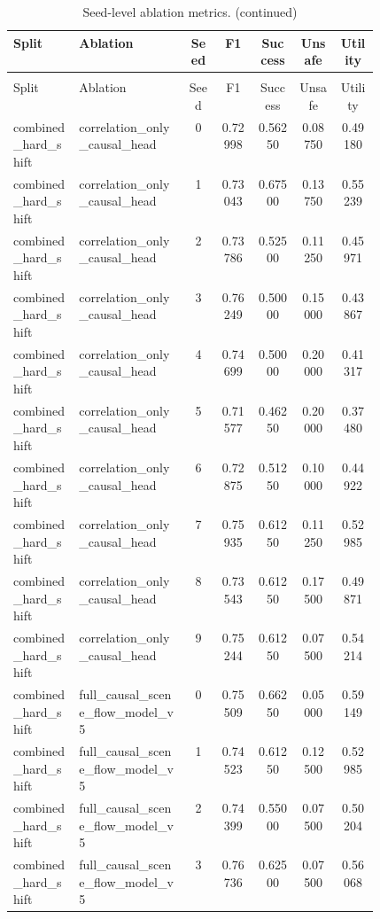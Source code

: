\documentclass{article}
\begin{document}
\begin{center}
\scriptsize
\begin{longtable}{p{0.18\linewidth}p{0.30\linewidth}ccccc}
\caption{Seed-level ablation metrics.}\label{tab:ablation-seeds}\\
\toprule
Split & Ablation & Seed & F1 & Success & Unsafe & Utility\\
\midrule
\endfirsthead
\caption[]{Seed-level ablation metrics. (continued)}\\
\toprule
Split & Ablation & Seed & F1 & Success & Unsafe & Utility\\
\midrule
\endhead
combined\_hard\_shift & correlation\_only\_causal\_head & 0 & 0.72998 & 0.56250 & 0.08750 & 0.49180\\
combined\_hard\_shift & correlation\_only\_causal\_head & 1 & 0.73043 & 0.67500 & 0.13750 & 0.55239\\
combined\_hard\_shift & correlation\_only\_causal\_head & 2 & 0.73786 & 0.52500 & 0.11250 & 0.45971\\
combined\_hard\_shift & correlation\_only\_causal\_head & 3 & 0.76249 & 0.50000 & 0.15000 & 0.43867\\
combined\_hard\_shift & correlation\_only\_causal\_head & 4 & 0.74699 & 0.50000 & 0.20000 & 0.41317\\
combined\_hard\_shift & correlation\_only\_causal\_head & 5 & 0.71577 & 0.46250 & 0.20000 & 0.37480\\
combined\_hard\_shift & correlation\_only\_causal\_head & 6 & 0.72875 & 0.51250 & 0.10000 & 0.44922\\
combined\_hard\_shift & correlation\_only\_causal\_head & 7 & 0.75935 & 0.61250 & 0.11250 & 0.52985\\
combined\_hard\_shift & correlation\_only\_causal\_head & 8 & 0.73543 & 0.61250 & 0.17500 & 0.49871\\
combined\_hard\_shift & correlation\_only\_causal\_head & 9 & 0.75244 & 0.61250 & 0.07500 & 0.54214\\
combined\_hard\_shift & full\_causal\_scene\_flow\_model\_v5 & 0 & 0.75509 & 0.66250 & 0.05000 & 0.59149\\
combined\_hard\_shift & full\_causal\_scene\_flow\_model\_v5 & 1 & 0.74523 & 0.61250 & 0.12500 & 0.52985\\
combined\_hard\_shift & full\_causal\_scene\_flow\_model\_v5 & 2 & 0.74399 & 0.55000 & 0.07500 & 0.50204\\
combined\_hard\_shift & full\_causal\_scene\_flow\_model\_v5 & 3 & 0.76736 & 0.62500 & 0.07500 & 0.56068\\

\end{longtable}
\end{center}
\end{document}

